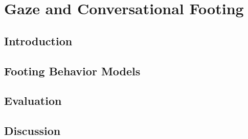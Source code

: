 \pagestyle{deposit}

\chapter{Gaze and Conversational Footing}
\label{cha:GazeFooting}

\section{Introduction}
\label{sec:GazeFootingIntro}


\section{Footing Behavior Models}
\label{sec:GazeFootingBehaviors}


\section{Evaluation}
\label{sec:GazeFootingExperiment}


\section{Discussion}
\label{sec:GazeFootingDiscussion}

